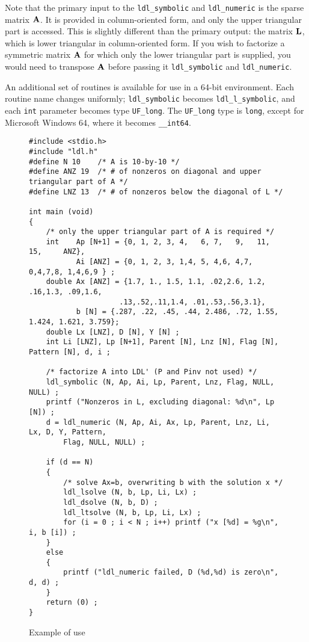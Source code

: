 \documentclass[12pt]{article}
\newcommand{\m}[1]{{\bf{#1}}}       %
\begin{document}
Note that the primary input to the {\tt ldl\_symbolic} and
{\tt ldl\_numeric} is the sparse matrix $\m{A}$.  It is provided in
column-oriented form, and only the upper triangular part is accessed.
This is slightly different than the primary output: the matrix $\m{L}$, 
which is lower triangular in column-oriented form.
If you wish to factorize a symmetric matrix $\m{A}$ for which only the lower
triangular part is supplied, you would need to transpose $\m{A}$ before
passing it {\tt ldl\_symbolic} and {\tt ldl\_numeric}.

An additional set of routines is available for use in a 64-bit environment.
Each routine name changes uniformly; {\tt ldl\_symbolic} becomes
{\tt ldl\_l\_symbolic}, and each {\tt int} parameter becomes type
{\tt UF\_long}.  The {\tt UF\_long} type is {\tt long}, except for
Microsoft Windows 64, where it becomes {\tt \_\_int64}.

\begin{figure}
\caption{Example of use}
\label{ldlsimple}
{\scriptsize
\begin{verbatim}
#include <stdio.h>
#include "ldl.h"
#define N 10    /* A is 10-by-10 */
#define ANZ 19  /* # of nonzeros on diagonal and upper triangular part of A */
#define LNZ 13  /* # of nonzeros below the diagonal of L */

int main (void)
{
    /* only the upper triangular part of A is required */
    int    Ap [N+1] = {0, 1, 2, 3, 4,   6, 7,   9,   11,      15,     ANZ},
           Ai [ANZ] = {0, 1, 2, 3, 1,4, 5, 4,6, 4,7, 0,4,7,8, 1,4,6,9 } ;
    double Ax [ANZ] = {1.7, 1., 1.5, 1.1, .02,2.6, 1.2, .16,1.3, .09,1.6,
                     .13,.52,.11,1.4, .01,.53,.56,3.1},
           b [N] = {.287, .22, .45, .44, 2.486, .72, 1.55, 1.424, 1.621, 3.759};
    double Lx [LNZ], D [N], Y [N] ;
    int Li [LNZ], Lp [N+1], Parent [N], Lnz [N], Flag [N], Pattern [N], d, i ;

    /* factorize A into LDL' (P and Pinv not used) */
    ldl_symbolic (N, Ap, Ai, Lp, Parent, Lnz, Flag, NULL, NULL) ;
    printf ("Nonzeros in L, excluding diagonal: %d\n", Lp [N]) ;
    d = ldl_numeric (N, Ap, Ai, Ax, Lp, Parent, Lnz, Li, Lx, D, Y, Pattern,
        Flag, NULL, NULL) ;

    if (d == N)
    {
        /* solve Ax=b, overwriting b with the solution x */
        ldl_lsolve (N, b, Lp, Li, Lx) ;
        ldl_dsolve (N, b, D) ;
        ldl_ltsolve (N, b, Lp, Li, Lx) ;
        for (i = 0 ; i < N ; i++) printf ("x [%d] = %g\n", i, b [i]) ;
    }
    else
    {
        printf ("ldl_numeric failed, D (%d,%d) is zero\n", d, d) ;
    }
    return (0) ;
}
\end{verbatim}
}
\end{figure}
\end{document}

